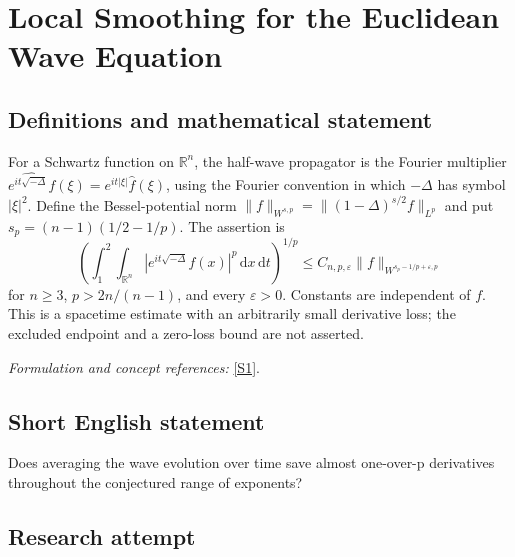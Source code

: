 \documentclass[11pt]{article}
\newcommand{\R}{\mathbb{R}}
\newcommand{\eps}{\varepsilon}
\newcommand{\dd}{\,\mathrm d}
\newcommand{\sref}[2]{\hyperlink{source:#1:#2}{[S#2]}}
\newif\ifshowcatalogue
\newcommand{\cataloguescope}[1]{\ifshowcatalogue
	\paragraph{Exact scope in the supplied catalogue.}
	\begin{quote}\small #1\end{quote}\fi}
\begin{document}
\setcounter{section}{0}
	\clearpage
\section*{\texorpdfstring{Local Smoothing for the Euclidean Wave Equation}{Local Smoothing for the Euclidean Wave Equation}}\label{statement}
	\subsection{Definitions and mathematical statement}
	For a Schwartz function on $\R^n$, the half-wave propagator is the Fourier multiplier
	$\widehat{e^{it\sqrt{-\Delta}}f}(\xi)=e^{it|\xi|}\widehat f(\xi)$, using the Fourier convention in which $-\Delta$ has symbol $|\xi|^2$. Define the Bessel-potential norm
	$\|f\|_{W^{s,p}}=\|(1-\Delta)^{s/2}f\|_{L^p}$ and put $s_p=(n-1)(1/2-1/p)$. The assertion is
	\[
	\left(\int_1^2\int_{\R^n}|e^{it\sqrt{-\Delta}}f(x)|^p\dd x\dd t\right)^{1/p}
	\le C_{n,p,\eps}\|f\|_{W^{s_p-1/p+\eps,p}}
	\]
	for $n\ge3$, $p>2n/(n-1)$, and every $\eps>0$. Constants are independent of $f$. This is a spacetime estimate with an arbitrarily small derivative loss; the excluded endpoint and a zero-loss bound are not asserted.
	\par\smallskip\textit{Formulation and concept references:} \sref{statement}{1}.
	\cataloguescope{For every n >= 3, p > 2n/(n-1), and epsilon > 0, prove ||exp(it sqrt(-Delta))f||\_\{L\textasciicircum{}p(R\textasciicircum{}n x [1,2])\} <= C\_\{p,epsilon\} ||f||\_\{W\textasciicircum{}\{s\_p-1/p+epsilon,p\}(R\textasciicircum{}n)\}, where s\_p=(n-1)(1/2-1/p).}
	\subsection{Short English statement}
	Does averaging the wave evolution over time save almost one-over-p derivatives throughout the conjectured range of exponents?
	\subsection{Research attempt}
	
\end{document}
